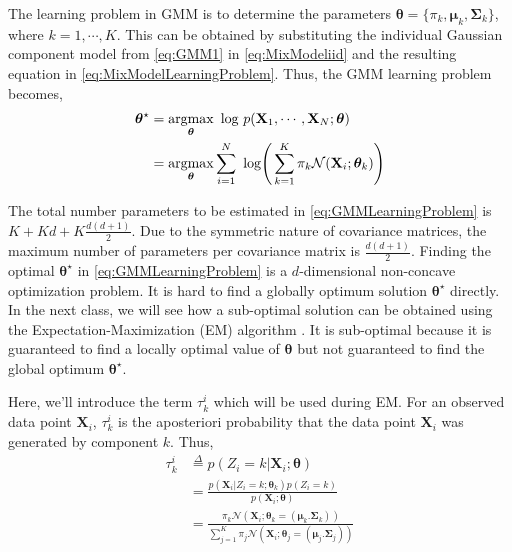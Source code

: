 \documentclass[twoside,11pt,a4paper]{book}
\newcommand{\data}[1]{\mathbf{#1}}
\begin{document}
The learning problem in GMM is to determine the parameters $\bm{\theta} = \{\pi_{k}, \bm{\mu}_{k}, \bm{\Sigma}_{k}\}$, where $k = 1, \cdots, K$. This can be obtained by substituting the individual Gaussian component model from \eqref{eq:GMM1} in \eqref{eq:MixModeliid} and the resulting equation in \eqref{eq:MixModelLearningProblem}. Thus, the GMM learning problem becomes,
\begin{align}
\bm{\theta}^{\star} &= \argmax_{\bm{\theta}} \ \text{log} \ p(\data{X}_{1}, \cdots, \data{X}_{N}; \bm{\theta}) \nonumber \\
&= \argmax_{\bm{\theta}} \sum_{i=1}^{N} \ \text{log} \Bigg( \sum_{k = 1}^{K} \pi_{k} \mathcal{N}(\data{X}_{i}; \bm{\theta}_{k}) \Bigg) \label{eq:GMMLearningProblem}
\end{align}


The total number parameters to be estimated in \eqref{eq:GMMLearningProblem} is $K + Kd + K\frac{d (d+1)}{2}$. Due to the symmetric nature of covariance matrices, the maximum number of parameters per covariance matrix is $\frac{d (d+1)}{2}$. Finding the optimal $\bm{\theta}^{\star}$ in \eqref{eq:GMMLearningProblem} is a $d$-dimensional non-concave optimization problem. It is hard to find a globally optimum solution $\bm{\theta}^{\star}$ directly. In the next class, we will see how a sub-optimal solution can be obtained using the Expectation-Maximization (EM) algorithm \cite{Dempster-EM}. It is sub-optimal because it is guaranteed to find a locally optimal value of $\bm{\theta}$ but not guaranteed to find the global optimum $\bm{\theta}^{\star}$.

Here, we'll introduce the term $\tau_{k}^{i}$ which will be used during EM. For an observed data point $\data{X}_{i}$, $\tau_{k}^{i}$ is the aposteriori probability that the data point $\data{X}_{i}$ was generated by component $k$. Thus,
\begin{align}
\tau_{k}^{i} & \stackrel{\Delta}{=} p(Z_{i} = k|\data{X}_{i}; \bm{\theta}) \nonumber \\
         &=  \frac{p(\data{X}_{i}|Z_{i} = k; \bm{\theta}_{k}) p(Z_{i} = k)}{p(\data{X}_{i}; \bm{\theta})} \nonumber \\
         &= \frac{\pi_{k} \mathcal{N}(\data{X}_{i}; \bm{\theta}_{k} = (\bm{\mu}_{k}. \bm{\Sigma}_{k}) )}{\sum_{j=1}^{K} \pi_{j} \mathcal{N}(\data{X}_{i}; \bm{\theta}_{j} = (\bm{\mu}_{j}. \bm{\Sigma}_{j}) )}
\end{align}


\end{document}
